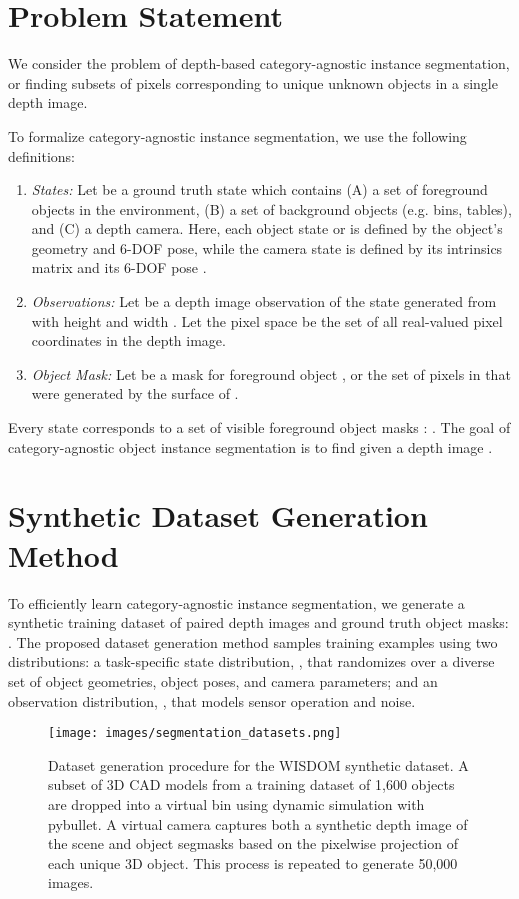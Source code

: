 \documentclass[letterpaper, 10 pt, conference]{ieeeconf}  \pdfoutput=1
\numberwithin{equation}{section}
\begin{document}
 \section{Problem Statement} 

We consider the problem of depth-based category-agnostic instance segmentation, or finding subsets of pixels corresponding to unique unknown objects in a single depth image.

To formalize category-agnostic instance segmentation, we use the following definitions:
\begin{enumerate}
    \item \textit{States:} Let  be a ground truth state which contains (A) a set of  foreground objects in the environment, (B) a set of  background objects (e.g. bins, tables), and (C) a depth camera. Here, each object state  or  is defined by the object's geometry and 6-DOF pose, while the camera state  is defined by its intrinsics matrix  and its 6-DOF pose .
    \item \textit{Observations:} Let  be a depth image observation of the state  generated from  with height  and width .
    Let the pixel space  be the set of all real-valued pixel coordinates in the depth image.
    \item \textit{Object Mask:} Let  be a mask for foreground object , or the set of pixels in  that were generated by the surface of .
\end{enumerate}

Every state  corresponds to a set of visible foreground object masks : . 
The goal of category-agnostic object instance segmentation is to find  given a depth image .




 \section{Synthetic Dataset Generation Method} 

To efficiently learn category-agnostic instance segmentation, we generate a synthetic training dataset of  paired depth images and ground truth object masks: .
The proposed dataset generation method samples training examples using two distributions: a task-specific state distribution, , that randomizes over a diverse set of object geometries, object poses, and camera parameters; and an observation distribution, , that models sensor operation and noise.

\begin{figure*}[t!]
    \centering
    \texttt{[image: images/segmentation\_datasets.png]}
    \caption{Dataset generation procedure for the WISDOM synthetic dataset. A subset of 3D CAD models from a training dataset of 1,600 objects are dropped into a virtual bin using dynamic simulation with pybullet. A virtual camera captures both a synthetic depth image of the scene and object segmasks based on the pixelwise projection of each unique 3D object. This process is repeated to generate 50,000 images.}
  \label{fig:synthetic_dataset} 
\end{figure*}
\end{document}
